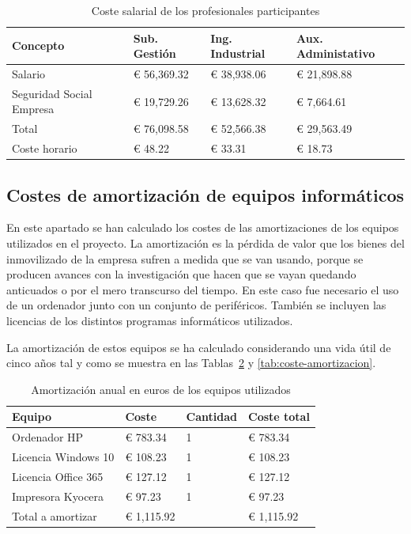 \begin{table}[H]
    \centering
    \begin{tabular}{llll}
        \toprule
        Concepto                 & Sub. Gestión & Ing. Industrial & Aux. Administativo \\
        \midrule
        Salario                  & € 56,369.32  & € 38,938.06     & € 21,898.88        \\
        Seguridad Social Empresa & € 19,729.26  & € 13,628.32     & € 7,664.61         \\
        \midrule
        Total                    & € 76,098.58  & € 52,566.38     & € 29,563.49        \\
        Coste horario            & € 48.22      & € 33.31         & € 18.73            \\
        \bottomrule
    \end{tabular}
    \caption{Coste salarial de los profesionales participantes}
    \label{tab:salarios}
\end{table}

\subsection{Costes de amortización de equipos informáticos}

En este apartado se han calculado los costes de las amortizaciones de los equipos utilizados en el proyecto.
La amortización es la pérdida de valor que los bienes del inmovilizado de la empresa sufren a medida que se van usando, porque se producen avances con la investigación que hacen que se vayan quedando anticuados o por el mero transcurso del tiempo.
En este caso fue necesario el uso de un ordenador junto con un conjunto de periféricos.
También se incluyen las licencias de los distintos programas informáticos utilizados.

La amortización de estos equipos se ha calculado considerando una vida útil de cinco años tal y como se muestra en las Tablas~\ref{tab:coste-equipos} y \ref{tab:coste-amortizacion}.

\begin{table}[H]
    \centering
    \begin{tabular}{llll}
        \toprule
        Equipo              & Coste      & Cantidad & Coste total \\
        \midrule
        Ordenador HP        & € 783.34   & 1        & € 783.34    \\
        Licencia Windows 10 & € 108.23   & 1        & € 108.23    \\
        Licencia Office 365 & € 127.12   & 1        & € 127.12    \\
        Impresora Kyocera   & € 97.23    & 1        & € 97.23     \\
        \midrule
        Total a amortizar   & € 1,115.92 &          & € 1,115.92  \\
        \bottomrule
    \end{tabular}
    \caption{Amortización anual en euros de los equipos utilizados}
    \label{tab:coste-equipos}
\end{table}

